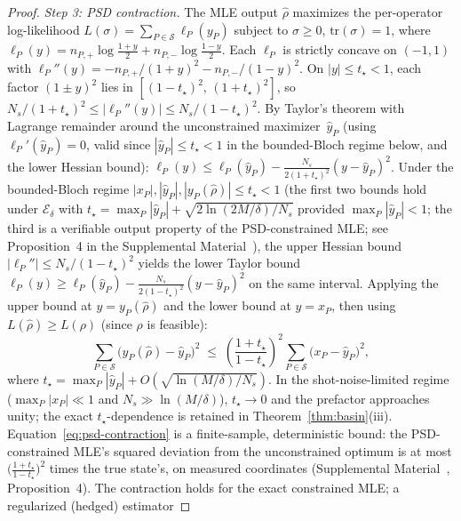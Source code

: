 \documentclass[twocolumn,prx,aps,superscriptaddress,longbibliography,floatfix]{revtex4-2}
\begin{document}
\begin{proof}
\emph{Step 3: PSD contraction.}
The MLE output $\hat\rho$ maximizes the per-operator
log-likelihood $L(\sigma) = \sum_{P \in \mathcal{S}} \ell_P(y_P)$
subject to $\sigma \ge 0$, $\mathrm{tr}(\sigma) = 1$,
where $\ell_P(y) = n_{P,+}\!\log\frac{1{+}y}{2}
+ n_{P,-}\!\log\frac{1{-}y}{2}$.
Each $\ell_P$ is strictly concave on $(-1,1)$ with
$\ell_P''(y) = -n_{P,+}/(1{+}y)^2 - n_{P,-}/(1{-}y)^2$.
On $|y| \le t_\star < 1$, each factor $(1 \pm y)^2$ lies in
$[(1{-}t_\star)^2,\,(1{+}t_\star)^2]$, so
$N_s/(1{+}t_\star)^2 \le |\ell_P''(y)| \le N_s/(1{-}t_\star)^2$.
By Taylor's theorem with Lagrange remainder around the
unconstrained maximizer~$\hat{y}_P$
(using $\ell_P'(\hat{y}_P) = 0$, valid since
$|\hat{y}_P| \le t_\star < 1$ in the bounded-Bloch
regime below, and the lower Hessian bound):
$\ell_P(y) \le \ell_P(\hat{y}_P) -
\tfrac{N_s}{2(1+t_\star)^2}(y - \hat{y}_P)^2$.
Under the bounded-Bloch regime
$|x_P|, |\hat{y}_P|, |y_P(\hat\rho)| \le t_\star < 1$
(the first two bounds hold under $\mathcal{E}_\delta$ with
$t_\star = \max_P |\hat{y}_P| + \sqrt{2\ln(2M/\delta)/N_s}$
provided $\max_P |\hat{y}_P| < 1$; the third is a verifiable
output property of the PSD-constrained MLE;
see Proposition~4 in the
Supplemental Material~\cite{supplemental}), the upper Hessian bound
$|\ell_P''| \le N_s/(1 - t_\star)^2$ yields the lower
Taylor bound $\ell_P(y) \ge \ell_P(\hat{y}_P)
- \tfrac{N_s}{2(1-t_\star)^2}(y - \hat{y}_P)^2$ on the same interval.
Applying the upper bound at $y = y_P(\hat\rho)$ and the lower bound
at $y = x_P$, then using $L(\hat\rho) \ge L(\rho)$
(since $\rho$ is feasible):
\begin{equation}\label{eq:psd-contraction}
  \sum_{P \in \mathcal{S}}
  \bigl(y_P(\hat\rho) - \hat{y}_P\bigr)^2
  \;\le\;
  \left(\frac{1+t_\star}{1-t_\star}\right)^{\!2}
  \sum_{P \in \mathcal{S}}
  \bigl(x_P - \hat{y}_P\bigr)^2,
\end{equation}
where $t_\star = \max_P |\hat{y}_P| + O(\sqrt{\ln(M/\delta)/N_s})$.
In the shot-noise-limited regime ($\max_P |x_P| \ll 1$ and $N_s \gg \ln(M/\delta)$),
$t_\star \to 0$ and the prefactor approaches unity;
the exact $t_\star$-dependence is retained in
Theorem~\ref{thm:basin}(iii).
Equation~\eqref{eq:psd-contraction} is a finite-sample,
deterministic bound: the PSD-constrained MLE's squared
deviation from the unconstrained optimum is at most
$\bigl(\frac{1+t_\star}{1-t_\star}\bigr)^{\!2}$ times
the true state's, on measured coordinates
(Supplemental Material~\cite{supplemental},
Proposition~4).  The contraction holds for the exact
constrained MLE; a regularized (hedged) estimator

\end{proof}
\end{document}
